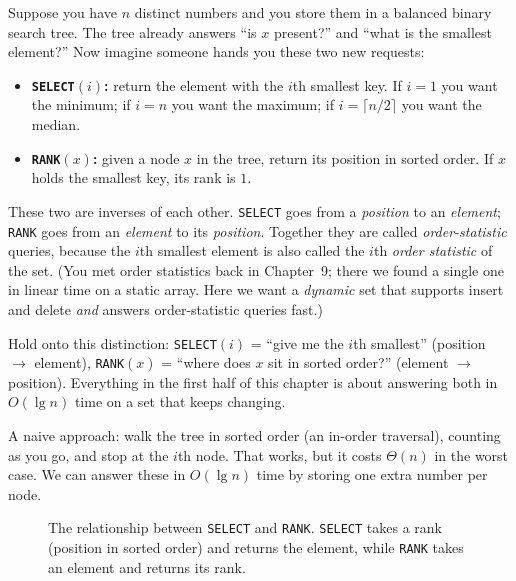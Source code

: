 Suppose you have $n$ distinct numbers and you store them in a balanced binary
search tree. The tree already answers ``is $x$ present?'' and ``what is the
smallest element?'' Now imagine someone hands you these two new requests:

\begin{itemize}
  \item \textbf{\texttt{SELECT}$(i)$:} return the element with the $i$th smallest
    key. If $i = 1$ you want the minimum; if $i = n$ you want the maximum; if
    $i = \lceil n/2 \rceil$ you want the median.
  \item \textbf{\texttt{RANK}$(x)$:} given a node $x$ in the tree, return its
    position in sorted order. If $x$ holds the smallest key, its rank is $1$.
\end{itemize}

These two are inverses of each other. \texttt{SELECT} goes from a \emph{position}
to an \emph{element}; \texttt{RANK} goes from an \emph{element} to its
\emph{position}. Together they are called \emph{order-statistic} queries, because
the $i$th smallest element is also called the $i$th \emph{order statistic} of the
set. (You met order statistics back in Chapter~9; there we found a
single one in linear time on a static array. Here we want a \emph{dynamic} set
that supports insert and delete \emph{and} answers order-statistic queries fast.)

\begin{focusbox}
Hold onto this distinction:
\texttt{SELECT}$(i)$ = ``give me the $i$th smallest'' (position $\to$ element),
\texttt{RANK}$(x)$ = ``where does $x$ sit in sorted order?'' (element $\to$
position). Everything in the first half of this chapter is about answering both
in $O(\lg n)$ time on a set that keeps changing.
\end{focusbox}

A naive approach: walk the tree in sorted order (an in-order traversal),
counting as you go, and stop at the $i$th node. That works, but it costs
$\Theta(n)$ in the worst case. We can answer these in $O(\lg n)$ time by storing one extra number per node.

\begin{figure}[htbp]
\centering
{}
\caption{The relationship between \texttt{SELECT} and \texttt{RANK}. \texttt{SELECT} takes a rank (position in sorted order) and returns the element, while \texttt{RANK} takes an element and returns its rank.}
\label{fig:select-rank-array}
\end{figure}

